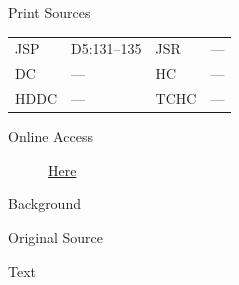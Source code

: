 			\begin{description}
					\item[Print Sources]
				\end{description}

					\begin{tabular}{p{0.5in}p{1in}p{0.5in}p{1in}}
					JSP	 	& D5:131--135		& JSR 		& --- \\
					DC	 	& ---				& HC 		& --- \\
					HDDC 	& ---				& TCHC 		& --- \\
					\end{tabular}
				
				\begin{description}
					\item[Online Access] \href{https://www.josephsmithpapers.org/paper-summary/blessing-to-lorenzo-barnes-3-january-1836/1}{Here}
				\end{description}
				
				\begin{description}
					\item[Background]
				\end{description}
				
				
				\begin{description}
					\item[Original Source]
				\end{description}
				
				
				\begin{description}
					\item[Text]
				\end{description}
				
